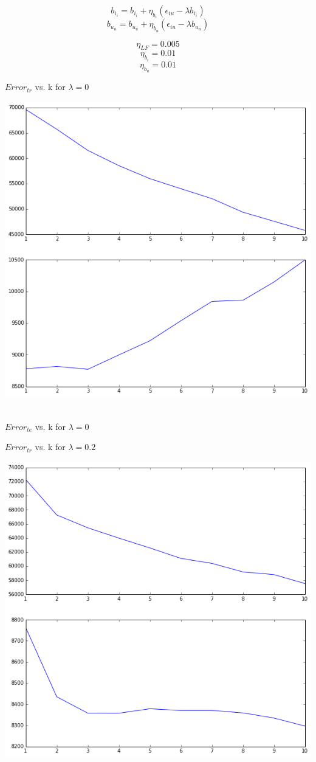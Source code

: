 \documentclass[11pt]{article}
\begin{document}
{$$b_{i_i} = b_{i_i} + \eta_{b_i} ( \epsilon_{iu} - \lambda b_{i_i})$$
$$b_{u_u} = b_{u_u} + \eta_{b_u} ( \epsilon_{iu} - \lambda b_{u_u})$$

$$\eta_{LF} = 0.005$$
$$\eta_{b_i} = 0.01$$
$$\eta_{b_u} = 0.01$$

\vspace{14cm}
$Error_{tr}$ vs. k for $ \lambda = 0$\

\includegraphics[scale=0.7]{q1errtrverrtelbias0}\

$Error_{te}$ vs. k for $ \lambda = 0$\

\vspace{8cm}
$Error_{tr}$ vs. k for $ \lambda = 0.2$\

\includegraphics[scale=0.8]{q1errtrverrtelbias02}\

}
\end{document}
